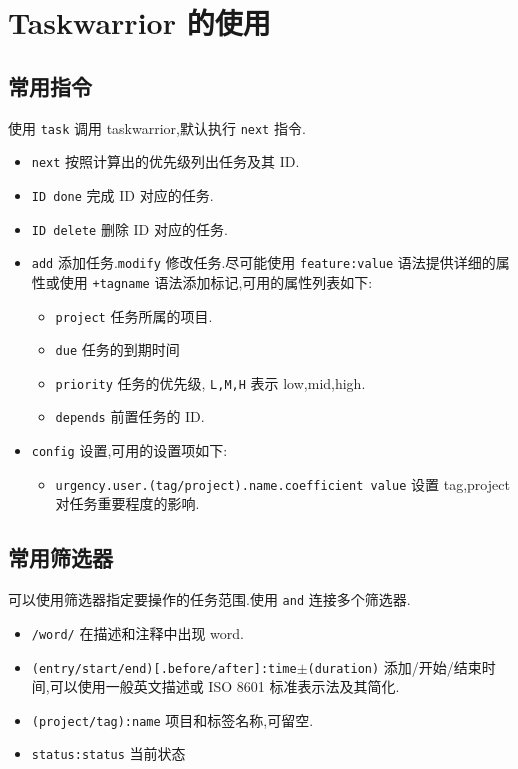 
\usepackage{../../lectures_preamble}


    \section{Taskwarrior 的使用}
    \subsection{常用指令}
    使用 \texttt{task} 调用 taskwarrior,默认执行 \texttt{next} 指令.
    \begin{itemize}
        \item \texttt{next} 按照计算出的优先级列出任务及其 ID.
        \item \texttt{ID done} 完成 ID 对应的任务.
        \item \texttt{ID delete} 删除 ID 对应的任务.
        \item \texttt{add} 添加任务.\texttt{modify} 修改任务.尽可能使用 \texttt{feature:value} 语法提供详细的属性或使用 \texttt{+tagname} 语法添加标记,可用的属性列表如下:
            \begin{itemize}
                \item \texttt{project} 任务所属的项目.
                \item \texttt{due} 任务的到期时间
                \item \texttt{priority} 任务的优先级, \texttt{L,M,H} 表示 low,mid,high.
                \item \texttt{depends} 前置任务的 ID.
            \end{itemize}
        \item \texttt{config} 设置,可用的设置项如下:
            \begin{itemize}
                \item \texttt{urgency.user.(tag/project).name.coefficient value} 设置 tag,project 对任务重要程度的影响.
            \end{itemize}
    \end{itemize}
    \subsection{常用筛选器}
    可以使用筛选器指定要操作的任务范围.使用 \texttt{and} 连接多个筛选器.
    \begin{itemize}
        \item \texttt{/word/} 在描述和注释中出现 word.
        \item \texttt{(entry/start/end)[.before/after]:time$\pm$(duration)} 添加/开始/结束时间,可以使用一般英文描述或 ISO 8601 标准表示法及其简化.
        \item \texttt{(project/tag):name} 项目和标签名称,可留空.
        \item \texttt{status:status} 当前状态
    \end{itemize}

